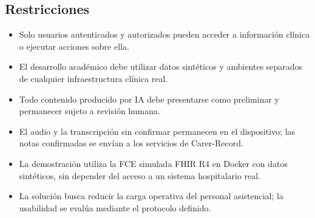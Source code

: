 \subsection{Restricciones}

\begin{itemize}
    \item Solo usuarios autenticados y autorizados pueden acceder a información clínica o ejecutar acciones sobre ella.
    \item El desarrollo académico debe utilizar datos sintéticos y ambientes separados de cualquier infraestructura clínica real.
    \item Todo contenido producido por IA debe presentarse como preliminar y permanecer sujeto a revisión humana.
    \item El audio y la transcripción sin confirmar permanecen en el dispositivo; las notas confirmadas se envían a los servicios de Carer-Record.
    \item La demostración utiliza la FCE simulada FHIR R4 en Docker con datos sintéticos, sin depender del acceso a un sistema hospitalario real.
    \item La solución busca reducir la carga operativa del personal asistencial; la usabilidad se evalúa mediante el protocolo definido.
\end{itemize}
